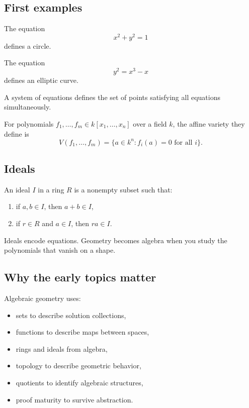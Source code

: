 \documentclass[12pt]{article}
\begin{document}
\subsection{First examples}

The equation
\[
x^2+y^2=1
\]
defines a circle.

The equation
\[
y^2=x^3-x
\]
defines an elliptic curve.

A system of equations defines the set of points satisfying all equations simultaneously.

\begin{definition}
For polynomials $f_1,\ldots,f_m\in k[x_1,\ldots,x_n]$ over a field $k$, the affine variety they define is
\[
V(f_1,\ldots,f_m)=\{a\in k^n:f_i(a)=0\text{ for all }i\}.
\]
\end{definition}

\subsection{Ideals}

\begin{definition}
An ideal $I$ in a ring $R$ is a nonempty subset such that:
\begin{enumerate}
\item if $a,b\in I$, then $a+b\in I$,
\item if $r\in R$ and $a\in I$, then $ra\in I$.
\end{enumerate}
\end{definition}

Ideals encode equations. Geometry becomes algebra when you study the polynomials that vanish on a shape.

\subsection{Why the early topics matter}

Algebraic geometry uses:

\begin{itemize}
\item sets to describe solution collections,
\item functions to describe maps between spaces,
\item rings and ideals from algebra,
\item topology to describe geometric behavior,
\item quotients to identify algebraic structures,
\item proof maturity to survive abstraction.
\end{itemize}
\end{document}

